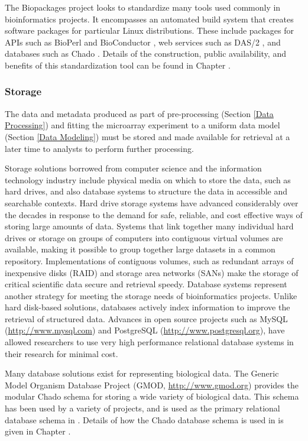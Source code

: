 The Biopackages project looks to standardize many tools used commonly in
bioinformatics projects. It encompasses an automated build system that creates
software packages for particular Linux distributions.  These include packages
for APIs such as BioPerl \cite{bioperl} and BioConductor \cite{bioc}, web
services such as DAS/2 \cite{das}, and databases such as Chado \cite{chado}.
Details of the construction, public availability, and benefits of this
standardization tool can be found in Chapter \biopackageschapter.

\subsubsection{Storage}\label{Storage}

The data and metadata produced as part of pre-processing (Section \ref{Data
Processing}) and fitting the microarray experiment to a uniform data model
(Section \ref{Data Modeling}) must be stored and made available for retrieval
at a later time to analysts to perform further processing.

Storage solutions borrowed from computer science and the information technology
industry include physical media on which to store the data, such as hard
drives, and also database systems to structure the data in accessible and
searchable contexts.  Hard drive storage systems have advanced considerably
over the decades in response to the demand for safe, reliable, and cost
effective ways of storing large amounts of data.  Systems that link together
many individual hard drives or storage on groups of computers into contiguous
virtual volumes are available, making it possible to group together large
datasets in a common repository.  Implementations of contiguous volumes, such
as redundant arrays of inexpensive disks (RAID) and storage area networks
(SANs) make the storage of critical scientific data secure and retrieval
speedy.  Database systems represent another strategy for meeting the storage
needs of bioinformatics projects.  Unlike hard disk-based solutions, databases
actively index information to improve the retrieval of structured data.
Advances in open source projects such as MySQL (\url{http://www.mysql.com}) and
PostgreSQL (\url{http://www.postgresql.org}), have allowed researchers to use
very high performance relational database systems in their research for minimal
cost.

Many database solutions exist for representing biological data.  The Generic
Model Organism Database Project (GMOD, \url{http://www.gmod.org}) provides the
modular Chado schema \cite{chado} for storing a wide variety of biological
data.  This schema has been used by a variety of projects, and is used as the
primary relational database schema in \dbthesis.  Details of how the Chado
database schema is used in \dbthesis is given in Chapter \dbthesis.
